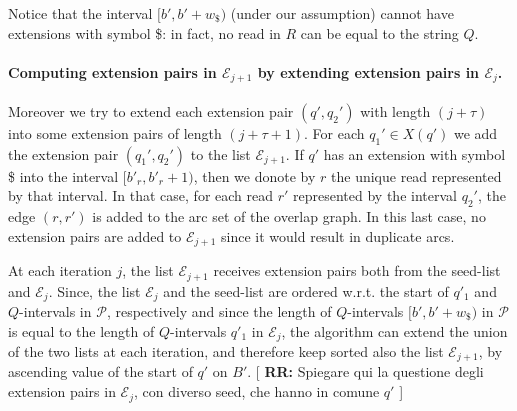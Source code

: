\documentclass[runningheads,envcountsame,a4paper]{llncs}
\newcommand{\notaestesa}[2]{%
 \marginpar{\color{red!75!black}\textbf{\texttimes}}%
 {\color{red!75!black}%
 [\,\textbullet\,\textsf{\textbf{#1:}} %
 \textsf{\footnotesize#2}\,\textbullet\,]}%
}
\newcommand{\ie}{\textit{i.e.}\xspace}
\begin{document}
Notice that the interval $[b', b'+w_\$)$ (under our assumption) cannot have
extensions with symbol \$: in fact, no read in $R$ can be equal to the string $Q$.

\paragraph{Computing  extension pairs in $\mathcal{E}_{j+1}$ by extending   extension pairs in $\mathcal{E}_{j}$.}

Moreover we try to extend each extension pair $(q', q_{2}')$ with length $(j+\tau)$ into some
extension pairs of length $(j+\tau+1)$.
For each $q_{1}'\in X(q')$ we add the extension pair  $(q_{1}',q_{2}')$ to
the list $\mathcal{E}_{j+1}$.
If  $q'$ has an  extension with symbol \$
into the interval $[b'_r, b'_r+1)$, then we donote by $r$ the unique  read represented by that
interval.
In that case, for   each read  $r'$ represented by the
interval $q_{2}'$, the edge $(r,r')$ is added to the arc set of the overlap graph.
In this last case, no extension pairs are added to $\mathcal{E}_{j+1}$ since it
would result in duplicate arcs.


At each iteration $j$, the list $\mathcal{E}_{j+1}$ receives extension
pairs both from the seed-list  and $\mathcal{E}_{j}$.
Since, the list  $\mathcal{E}_{j}$  and the seed-list are ordered w.r.t. the start of  $q'_1$ and $Q$-intervals in $\mathcal{P}$, respectively and since the  length of $Q$-intervals $[b', b'+w_\$)$ in $\mathcal{P}$ is
equal to the length  of  $Q$-intervals $q'_1$ in $\mathcal{E}_{j}$, the
algorithm can extend the union of the two lists at each iteration, and therefore keep
sorted also the list $\mathcal{E}_{j+1}$, by ascending value of the
start of $q'$ on $B'$.\notaestesa{RR}{Spiegare qui la questione degli extension pairs in $\mathcal{E}_j$, con diverso seed, che hanno in comune $q'$}
\end{document}
